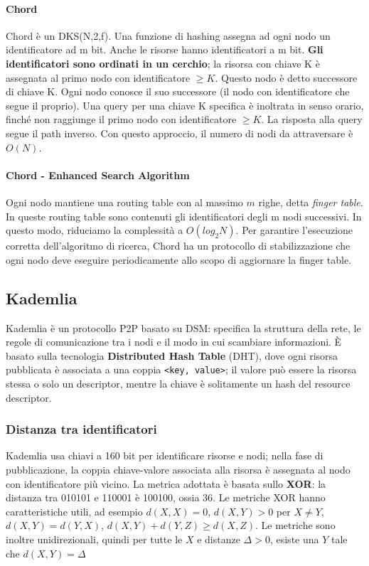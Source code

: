 \documentclass[11pt]{article}
\newcommand{\code}[1]{\texttt{#1}}
\begin{document}
\paragraph{Chord} Chord è un DKS(N,2,f). Una funzione di hashing assegna ad ogni nodo un identificatore ad m bit. Anche le risorse hanno identificatori a m bit. \textbf{Gli identificatori sono ordinati in un cerchio}; la risorsa con chiave K è assegnata al primo nodo con identificatore $\ge K$. Questo nodo è detto successore di chiave K. Ogni nodo conosce il suo successore (il nodo con identificatore che segue il proprio). Una query per una chiave K specifica è inoltrata in senso orario, finché non raggiunge il primo nodo con identificatore $\ge K$. La risposta alla query segue il path inverso. Con questo approccio, il numero di nodi da attraversare è $O(N)$. 
\paragraph{Chord - Enhanced Search Algorithm} Ogni nodo mantiene una routing table con al massimo $m$ righe, detta \textit{finger table}. In queste routing table sono contenuti gli identificatori degli m nodi successivi. In questo modo, riduciamo la complessità a $O(log_2N)$. Per garantire l'esecuzione corretta dell'algoritmo di ricerca, Chord ha un protocollo di stabilizzazione che ogni nodo deve eseguire periodicamente allo scopo di aggiornare la finger table.

\subsection{Kademlia} Kademlia è un protocollo P2P basato su DSM: specifica la struttura della rete, le regole di comunicazione tra i nodi e il modo in cui scambiare informazioni. È basato sulla tecnologia \textbf{Distributed Hash Table} (DHT), dove ogni risorsa pubblicata è associata a una coppia \code{<key, value>}; il valore può essere la risorsa stessa o solo un descriptor, mentre la chiave è solitamente un hash del resource descriptor. 
\subsubsection{Distanza tra identificatori} Kademlia usa chiavi a 160 bit per identificare risorse e nodi; nella fase di pubblicazione, la coppia chiave-valore associata alla risorsa è assegnata al nodo con identificatore più vicino. La metrica adottata è basata sullo \textbf{XOR}: la distanza tra 010101 e 110001 è 100100, ossia 36. Le metriche XOR hanno caratteristiche utili, ad esempio $d(X,X) = 0$, $d(X,Y) > 0$ per $X \neq Y$, $d(X,Y) = d(Y,X)$, $d(X,Y) + d(Y,Z) \ge d(X,Z)$. Le metriche sono inoltre unidirezionali, quindi per tutte le $X$ e distanze $\Delta > 0$, esiste una $Y$ tale che $d(X,Y) = \Delta$
\end{document}
